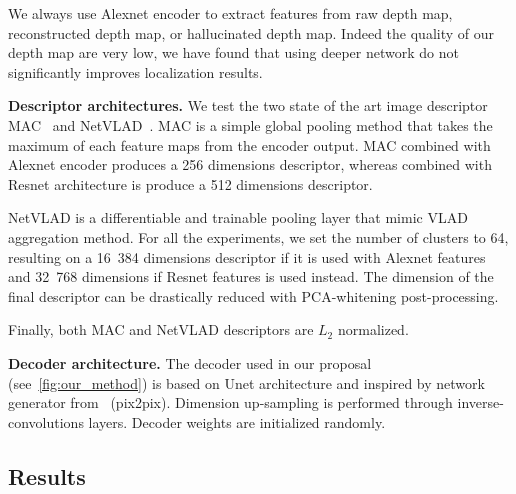 We always use Alexnet encoder to extract features from raw depth map, reconstructed depth map, or hallucinated depth map. Indeed the quality of our depth map are very low, we have found that using deeper network do not significantly improves localization results.

\noindent\textbf{Descriptor architectures.} We test the two state of the art image descriptor MAC~\cite{Radenovic2017} and NetVLAD~\cite{Arandjelovic2017}. MAC is a simple global pooling method that takes the maximum of each feature maps from the encoder output. MAC combined with Alexnet encoder produces a 256 dimensions descriptor, whereas combined with Resnet architecture is produce a 512 dimensions descriptor.

NetVLAD is a differentiable and trainable pooling layer that mimic VLAD aggregation method. For all the experiments, we set the number of clusters to 64, resulting on a 16~384 dimensions descriptor if it is used with Alexnet features and 32~768 dimensions if Resnet features is used instead. The dimension of the final descriptor can be drastically reduced with PCA-whitening post-processing.

Finally, both MAC and NetVLAD descriptors are $L_{2}$ normalized.

\noindent\textbf{Decoder architecture.} The decoder used in our proposal (see~\ref{fig:our_method}) is based on Unet architecture and inspired by network generator from~\cite{} (pix2pix). Dimension up-sampling is performed through inverse-convolutions layers. Decoder weights are initialized randomly.

\subsection{Results}
\label{subsec:results}

